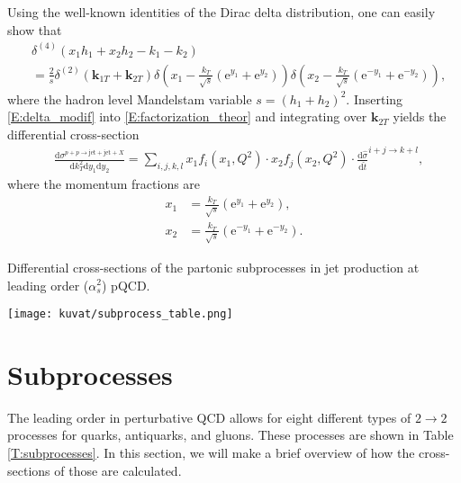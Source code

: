 \documentclass[a4paper, twoside, english, 12pt]{report}
\begin{document}
Using the well-known identities of the Dirac delta distribution, one can easily show that
\begin{align}\label{E:delta_modif}
	&\delta^{(4)}(x_1h_1+x_2h_2-k_1-k_2) \nonumber\\[1em] &= \frac{2}{s}
	\delta^{(2)}(\mathbf{k}_{1T}+\mathbf{k}_{2T})\delta \left(x_1- \frac{k_T}{\sqrt{s}}\left(\mathrm{e}^{y_1}+\mathrm{e}^{y_2}\right)\right) \delta \left(x_2- \frac{k_T}{\sqrt{s}}\left(\mathrm{e}^{-y_1}+\mathrm{e}^{-y_2}\right)\right),
\end{align}
where the hadron level Mandelstam variable $s=(h_1+h_2)^2$. Inserting \eqref{E:delta_modif} into \eqref{E:factorization_theor} and integrating over $\mathbf{k}_{2T}$ yields the differential cross-section
\begin{align}
&\frac{\text{d}\sigma^{p+p\rightarrow\text{jet}+\text{jet}+X}}{\text{d}k_T^2\text{d}y_1\text{d}y_2} = \sum_{i,j,k,l} x_1f_i(x_1,Q^2)\cdot x_2f_j(x_2,Q^2) \cdot\frac{\text{d}\hat{\sigma}}{\text{d}\hat{t}}^{i+j\rightarrow k+l},\label{E:dijet_cross_section}
\end{align}
where the momentum fractions are
\begin{align}
x_1 &= \frac{k_T}{\sqrt{s}}\left(\mathrm{e}^{y_1}+\mathrm{e}^{y_2}\right)\label{E:x1_from_ktandys} ,\\[1em]
x_2 &= \frac{k_T}{\sqrt{s}}\left(\mathrm{e}^{-y_1}+\mathrm{e}^{-y_2}\right).\label{E:x2_from_ktandys}  
\end{align}

\begin{table}[htp!]
	\centering
	\caption{Differential cross-sections of the partonic subprocesses in jet production at leading order ($\alpha_s^2$) pQCD. \cite{erkka, RiPa,  eichsubpro}}
	\label{T:subprocesses}
	\begin{adjustwidth}{-1cm}{-2cm}
		\texttt{[image: kuvat/subprocess\_table.png]}
	\end{adjustwidth}
\end{table}

\section{Subprocesses}

The leading order in perturbative QCD allows for eight different types of $2 \rightarrow 2$ processes for quarks, antiquarks, and gluons. These processes are shown in Table \ref{T:subprocesses}. In this section, we will make a brief overview of how the cross-sections of those are calculated.
\end{document}
